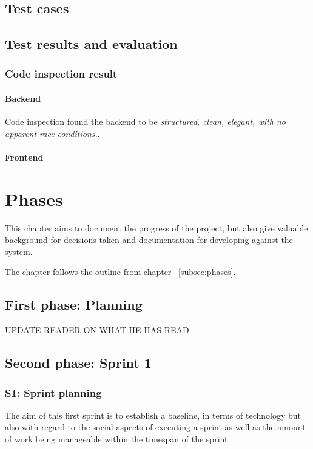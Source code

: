 \documentclass[11pt]{book}
\begin{document}
\section{Test cases} \label{sec:test_cases}


\section{Test results and evaluation}

\subsection{Code inspection result}

\subsubsection{Backend}

Code inspection found the backend to be \emph{structured, clean, elegant, with no apparent race conditions.}.

\subsubsection{Frontend}


\chapter{Phases}
This chapter aims to document the progress of the project, but also give valuable background for decisions taken and documentation for developing against the system.

The chapter follows the outline from chapter ~\ref{subsec:phases}.

\section{First phase: Planning}
UPDATE READER ON WHAT HE HAS READ

\section{Second phase: Sprint 1}
\subsection{S1: Sprint planning}
The aim of this first sprint is to establish a baseline, in terms of technology but also with regard to the social aspects of executing a sprint as well as the amount of work being manageable within the timespan of the sprint.
\end{document}
